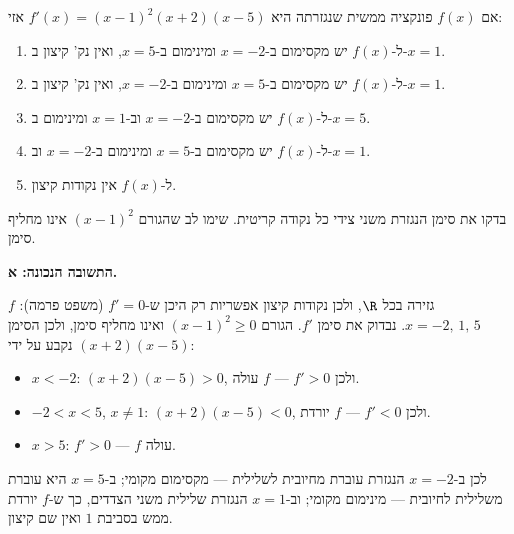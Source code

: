 
\begin{question}
אם $f(x)$ פונקציה ממשית שנגזרתה היא $f'(x)=(x-1)^2(x+2)(x-5)$ אזי:
\begin{enumerate}
  \item ל-$f(x)$ יש מקסימום ב-$x=-2$ ומינימום ב-$x=5$, ואין נק' קיצון ב-$x=1$.
  \item ל-$f(x)$ יש מקסימום ב-$x=5$ ומינימום ב-$x=-2$, ואין נק' קיצון ב-$x=1$.
  \item ל-$f(x)$ יש מקסימום ב-$x=-2$ וב-$x=1$ ומינימום ב-$x=5$.
  \item ל-$f(x)$ יש מקסימום ב-$x=5$ ומינימום ב-$x=-2$ וב-$x=1$.
  \item ל-$f(x)$ אין נקודות קיצון.
\end{enumerate}
\end{question}

\begin{hint}
בדקו את סימן הנגזרת משני צידי כל נקודה קריטית. שימו לב שהגורם $(x-1)^2$ אינו מחליף סימן.
\end{hint}

\begin{solution}
\textbf{התשובה הנכונה: א.}

$f$ גזירה בכל $\R$, ולכן נקודות קיצון אפשריות רק היכן ש-$f'=0$ (משפט פרמה): $x=-2,\,1,\,5$. נבדוק את סימן $f'$. הגורם $(x-1)^2\ge0$ ואינו מחליף סימן, ולכן הסימן נקבע על ידי $(x+2)(x-5)$:
\begin{itemize}
  \item $x<-2$: $(x+2)(x-5)>0$, ולכן $f'>0$ --- $f$ עולה.
  \item $-2<x<5$, $x\neq 1$: $(x+2)(x-5)<0$, ולכן $f'<0$ --- $f$ יורדת.
  \item $x>5$: $f'>0$ --- $f$ עולה.
\end{itemize}
לכן ב-$x=-2$ הנגזרת עוברת מחיובית לשלילית --- מקסימום מקומי; ב-$x=5$ היא עוברת משלילית לחיובית --- מינימום מקומי; וב-$x=1$ הנגזרת שלילית משני הצדדים, כך ש-$f$ יורדת ממש בסביבת $1$ ואין שם קיצון.
\end{solution}
